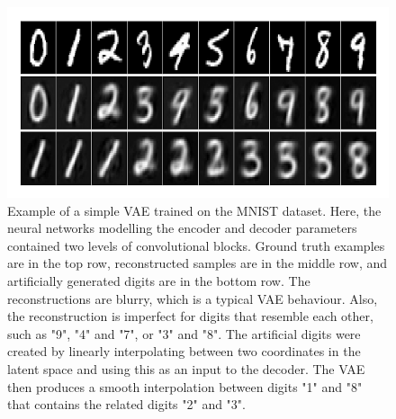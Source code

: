 \begin{figure}
\centering{}\includegraphics[scale=0.8]{data/chapter_survey/mnist_reconstruction_generation}\caption{Example of a simple VAE trained on the MNIST dataset. Here, the neural networks modelling the encoder and decoder parameters contained two levels of convolutional blocks. Ground truth examples are in the top row, reconstructed samples are in the middle row, and artificially generated digits are in the bottom row. The reconstructions are blurry, which is a typical VAE behaviour. Also, the reconstruction is imperfect for digits that resemble each other, such as "9", "4" and "7", or "3" and "8". The artificial digits were created by linearly interpolating between two coordinates in the latent space and using this as an input to the decoder. The VAE then produces a smooth interpolation between digits "1" and "8" that contains the related digits "2" and "3".}
\label{fig:mnist_reconstruction}
\end{figure}
 
